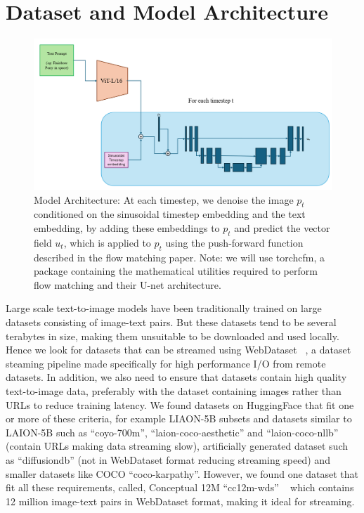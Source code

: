 \documentclass[12pt]{article}
\begin{document}
\section{Dataset and Model Architecture}
\begin{figure}[ht]
  \centering
  \includegraphics[width=0.75\linewidth]{Figures/model_arch.png}
  \caption{Model Architecture: At each timestep, we denoise the image $p_t$ conditioned on the sinusoidal timestep embedding and the text embedding, by adding these embeddings to $p_t$ and predict the vector field $u_t$, which is applied to $p_t$ using the push-forward function described in the flow matching paper. Note: we will use torchcfm, a package containing the mathematical utilities required to perform flow matching and their U-net architecture.}
\end{figure}
Large scale text-to-image models have been traditionally trained on large datasets consisting of image-text pairs. But these datasets tend to be several terabytes in size, making them unsuitable to be downloaded and used locally. Hence we look for datasets that can be streamed using WebDataset ~\cite{aizman2019high}, a dataset steaming pipeline made specifically for high performance I/O from remote datasets. In addition, we also need to ensure that datasets contain high quality text-to-image data, preferably with the dataset containing images rather than URLs to reduce training latency. We found datasets on HuggingFace that fit one or more of these criteria, for example LIAON-5B subsets and datasets similar to LAION-5B such as ``coyo-700m'', ``laion-coco-aesthetic'' and ``laion-coco-nllb'' (contain URLs making data streaming slow), artificially generated dataset such as ``diffusiondb'' (not in WebDataset format reducing streaming speed) and smaller datasets like COCO ``coco-karpathy''. However, we found one dataset that fit all these requirements, called, Conceptual 12M ``cc12m-wds'' ~\cite{changpinyo2021cc12m} which contains 12 million image-text pairs in WebDataset format, making it ideal for streaming.
\end{document}
